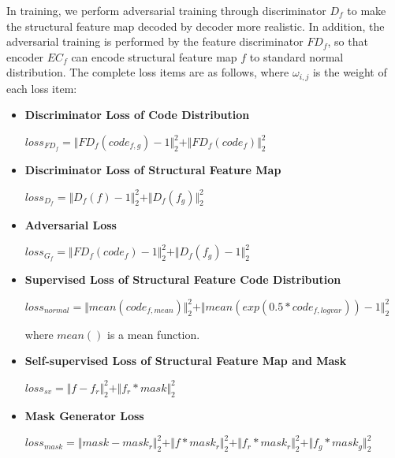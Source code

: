 \documentclass[letterpaper]{article} %
\begin{document}
In training, we perform adversarial training through discriminator $D_f$ to make the structural feature map decoded by decoder more realistic. In addition, the adversarial training is performed by the feature discriminator $FD_f$, so that encoder $EC_f$ can encode structural feature map $f$ to standard normal distribution. The complete loss items are as follows, where $\omega_{i,j}$ is the weight of each loss item: 
\begin{itemize}
	\item \textbf{Discriminator Loss of Code Distribution } 
	\begin{center}
		$loss_{FD_f}=\Vert{FD_f(code_{f,g})-1}\Vert_{2}^{2}+\Vert{FD_f(code_f)}\Vert_{2}^{2}$
	\end{center}
	
	\item \textbf{Discriminator Loss of Structural Feature Map} 
	\begin{center}
		$loss_{D_f}=\Vert{D_f(f)-1}\Vert_{2}^{2}+\Vert{D_f(f_g )}\Vert_{2}^{2}$
	\end{center}
	
	\item \textbf{Adversarial Loss} 
	\begin{center}
		$loss_{G_f}=\Vert{FD_f(code_f)-1}\Vert_{2}^{2}+\Vert{D_f(f_g)-1}\Vert_{2}^{2}$
	\end{center}
	
	\item \textbf{Supervised Loss of Structural Feature Code Distribution} 
	\begin{center}
		$loss_{normal}=\Vert{mean(code_{f,mean})}\Vert_{2}^{2}+ \Vert{mean(exp(0.5*code_{f,logvar}))-1}\Vert_{2}^{2}$
	\end{center}
	where $mean()$ is a mean function.
	
	\item \textbf{Self-supervised Loss of Structural Feature Map and Mask} 
	\begin{center}
		$loss_{sv}=\Vert{f-f_r}\Vert_{2}^{2}+\Vert{f_r*mask}\Vert_{2}^{2}$
	\end{center}
	
	\item \textbf{Mask Generator Loss}
	\begin{center}
		$loss_{mask}=\Vert{mask-mask_r }\Vert_{2}^{2}+\Vert{f*mask_r}\Vert_{2}^{2}+\Vert{f_r*mask_r}\Vert_{2}^{2}+\Vert{f_g*mask_g}\Vert_{2}^{2}$
	\end{center}
\end{itemize}
\end{document}
